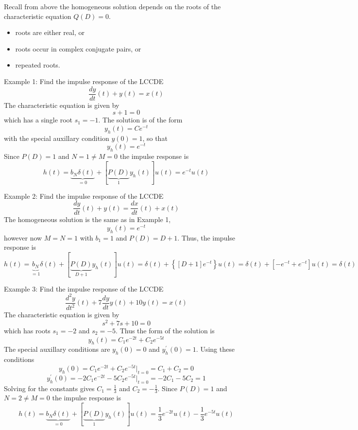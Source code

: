 Recall from above the homogeneous solution depends on the roots of the characteristic equation $Q(D) = 0$.

\begin{itemize}
\item roots are either real, or
\item roots occur in complex conjugate pairs, or
\item repeated roots.
\end{itemize}

Example 1: Find the impulse response of the LCCDE
\[
\frac{dy}{dt}(t) + y(t) = x(t)
\]
The characteristic equation is given by
\[
s + 1 = 0
\]
which has a single root $s_1 = -1$. The solution is of the form
\[
y_h(t) = Ce^{-t} 
\]
with the special auxillary condition $y(0) = 1$, so that
\[
y_h(t) = e^{-t} 
\]
Since $P(D) = 1$ and $N = 1 \neq M = 0$ the impulse response is
\[
h(t) = \underbrace{b_N\delta(t)}_{=0} + \left[ \underbrace{P(D)}_{1}y_h(t)\right]u(t) = e^{-t}u(t)
\]

Example 2: Find the impulse response of the LCCDE
\[
\frac{dy}{dt}(t) + y(t) = \frac{dx}{dt}(t) + x(t)
\]
The homogeneous solution is the same as in Example 1,
\[
y_h(t) = e^{-t} 
\]
however now $M = N = 1$ with $b_1 = 1$ and $P(D) = D+1$. Thus, the impulse response is
\[
h(t) = \underbrace{b_N}_{=1}\delta(t) + \left[ \underbrace{P(D)}_{D+1}y_h(t)\right]u(t) = \delta(t) + \left\{[D+1]e^{-t}\right\}u(t) = \delta(t) + [- e^{-t} + e^{-t}]u(t) = \delta(t) 
\]

Example 3: Find the impulse response of the LCCDE
\[
\frac{d^2y}{dt^2}(t) + 7\frac{dy}{dt}y(t) + 10y(t) = x(t) 
\]
The characteristic equation is given by
\[
s^2 + 7s + 10 = 0
\]
which has roots $s_1 = -2$ and $s_2 = -5$. Thus the form of the solution is
\[
y_h(t) = C_1e^{-2t} + C_2e^{-5t}
\]
The special auxillary conditions are $y_h(0) = 0$ and $y^\prime_h(0) = 1$. Using these conditions
\[
y_h(0) = C_1e^{-2t} + C_2e^{-5t} |_{t = 0} = C_1 + C_2 = 0
\]
\[
y^\prime_h(0) = -2C_1e^{-2t} - 5C_2e^{-5t} |_{t = 0} = -2C_1 -5C_2 = 1
\]
Solving for the constants gives $C_1 = \frac{1}{3}$ and $C_2 = -\frac{1}{3}$. Since $P(D) = 1$ and $N = 2 \neq M = 0$ the impulse response is
\[
h(t) = \underbrace{b_N\delta(t)}_{=0} + \left[ \underbrace{P(D)}_{1}y_h(t)\right]u(t) = \frac{1}{3} e^{-2t}u(t) - \frac{1}{3} e^{-5t}u(t)
\]


